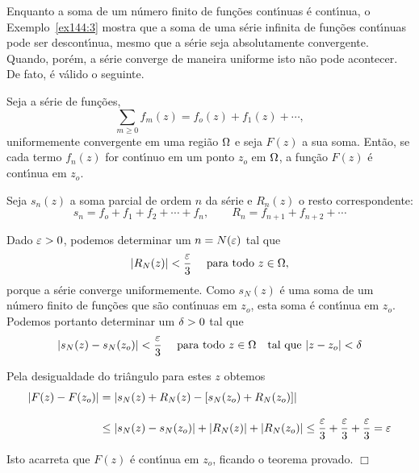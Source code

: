 Enquanto a soma de um n\'{u}mero finito de fun\c{c}\~{o}es cont\'{\i}nuas \'{e}
cont\'{\i}nua, o Exemplo~\ref{ex144:3}  mostra que a soma de uma s\'{e}rie
infinita de fun\c{c}\~{o}es cont\'{\i}nuas pode ser descont\'{\i}nua, mesmo que a
s\'{e}rie seja absolutamente convergente. Quando, por\'{e}m, a s\'{e}rie
converge de maneira uniforme isto n\~{a}o pode acontecer. De fato, \'{e}
v\'{a}lido o seguinte.

\begin{teo} \label{orf144:2}
Seja a s\'{e}rie de fun\c{c}\~{o}es,
\begin{equation*}
\sum_{m\geq 0}f_m(z)=f_o(z)+f_1(z)+\cdots,
\end{equation*}
uniformemente convergente em uma regi\~{a}o $\Omega$ e seja $F(z)$ a sua
soma. Ent\~{a}o, se cada termo $f_n(z)$ for cont\'{\i}nuo em um ponto $z_o$
em $\Omega$, a fun\c{c}\~{a}o $F(z)$ \'{e} cont\'{\i}nua em $z_o$.
\end{teo}

\prova Seja $s_n(z)$ a soma parcial de ordem $n$ da s\'{e}rie e
$R_n(z)$ o resto correspondente:
\begin{equation*}
s_n=f_o+f_1+f_2+\cdots+f_n,\qquad R_n=f_{n+1}+f_{n+2}+\cdots
\end{equation*}

Dado $\varepsilon > 0$, podemos determinar um $n = N(\varepsilon)$ tal que
\begin{equation*}
|R_N(z)| < \frac{\varepsilon}{3}\quad \text{ para todo } z \in  \Omega,
\end{equation*}
porque a s\'{e}rie converge uniformemente. Como $s_N(z)$ \'{e} uma soma de
um n\'{u}mero finito de fun\c{c}\~{o}es que s\~{a}o cont\'{\i}nuas em $z_o$, esta soma
\'{e} cont\'{\i}nua em $z_o$. Podemos portanto determinar um $\delta > 0$ tal
que
\begin{equation*}
 |s_N(z) - s_N(z_o)| < \frac{\varepsilon}{3}\quad \text{ para todo } z \in \Omega\quad \text{tal que }
  |z- z_o| < \delta
\end{equation*}

Pela desigualdade do tri\^{a}ngulo  para estes $z$ obtemos
\begin{align*}
|F(z)-F(z_o)| &=| s_N(z) + R_N(z) - [s_N(z_o) + R_N(z_o)]| \\[2ex]
&\le | s_N(z) - s_N (z_o)| + | R_N(z)| + | R_N(z_o)|\le
\frac{\varepsilon}{3}+\frac{\varepsilon}{3}+\frac{\varepsilon}{3}=\varepsilon
\end{align*}

Isto acarreta que $F(z)$ \'{e} cont\'{\i}nua em $z_o$, ficando o teorema
provado. \hfill $\Box$

